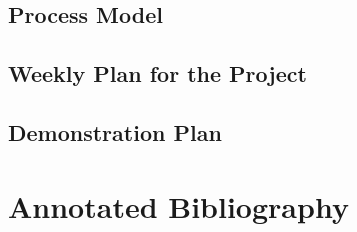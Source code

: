 \documentclass[11pt,fleqn,twoside]{article}
\begin{document}
\subsection{Process Model}

\subsection{Weekly Plan for the Project}

\subsection{Demonstration Plan}

\section*{Annotated Bibliography}





\renewcommand{\refname}{}  


\listoftables
\end{document}
